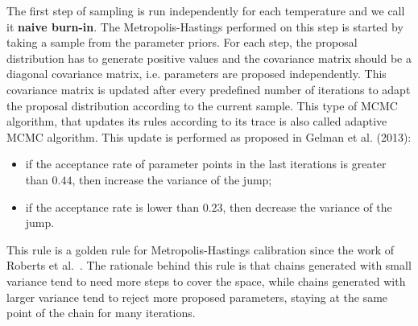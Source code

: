 %

The first step of sampling is run independently for each temperature and
we call it {\bf naive burn-in}. The Metropolis-Hastings performed on 
this step is started by taking a sample from the parameter priors. For 
each step, the proposal distribution has to generate positive values and 
the covariance matrix should be a diagonal covariance matrix, i.e. 
parameters are proposed independently. This covariance matrix is updated 
after every predefined number of iterations to adapt the proposal 
distribution according to the current sample. This type of MCMC 
algorithm, that updates its rules according to its trace is also called
adaptive MCMC algorithm. This update is performed as proposed in Gelman 
et al. (2013): 
\begin{itemize}
\item{if the acceptance rate of parameter points in the last 
    iterations is greater than $0.44$, then increase the variance of the
    jump;}
\item{if the acceptance rate is lower than $0.23$, then decrease the 
    variance of the jump.}
\end{itemize}
This rule is a golden rule for Metropolis-Hastings calibration since the
work of Roberts et al.~\cite{Roberts1997}. The rationale behind this
rule is that chains generated with small variance tend to need more 
steps to cover the space, while chains generated with larger variance
tend to reject more proposed parameters, staying at the same point of
the chain for many iterations.

